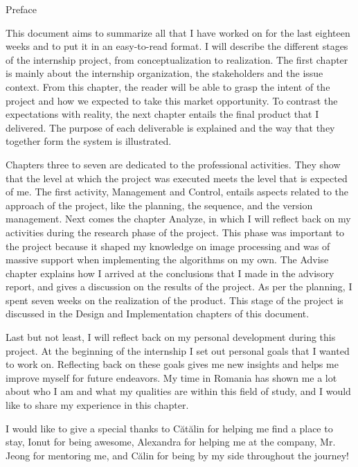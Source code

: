 \documentclass{matthijs}
\begin{document}
	\begin{hoofdstuk*}{Preface}

		\setlength\parindent{1.5em}
		\setlength{\parskip}{0.5em plus 0.2em minus 0.1em}
		\linespread{1.2}

		This document aims to summarize all that I have worked on for the last eighteen weeks and to put it in an easy-to-read format.
		I will describe the different stages of the internship project, from conceptualization to realization.
		The first chapter is mainly about the internship organization, the stakeholders and the issue context.
		From this chapter, the reader will be able to grasp the intent of the project and how we expected to take this market opportunity.
		To contrast the expectations with reality, the next chapter entails the final product that I delivered.
		The purpose of each deliverable is explained and the way that they together form the system is illustrated.

		Chapters three to seven are dedicated to the professional activities.
		They show that the level at which the project was executed meets the level that is expected of me.
		The first activity, Management and Control, entails aspects related to the approach of the project, like the planning, the sequence, and the version management.
		Next comes the chapter Analyze, in which I will reflect back on my activities during the research phase of the project.
		This phase was important to the project because it shaped my knowledge on image processing and was of massive support when implementing the algorithms on my own.
		The Advise chapter explains how I arrived at the conclusions that I made in the advisory report, and gives a discussion on the results of the project.
		As per the planning, I spent seven weeks on the realization of the product.
		This stage of the project is discussed in the Design and Implementation chapters of this document.

		Last but not least, I will reflect back on my personal development during this project.
		At the beginning of the internship I set out personal goals that I wanted to work on.
		Reflecting back on these goals gives me new insights and helps me improve myself for future endeavors.
		My time in Romania has shown me a lot about who I am and what my qualities are within this field of study, and I would like to share my experience in this chapter.
		
		I would like to give a special thanks to Cătălin for helping me find a place to stay, Ionut for being awesome, Alexandra for helping me at the company, Mr. Jeong for mentoring me, and Călin for being by my side throughout the journey!

	\end{hoofdstuk*}
	
\end{document}
